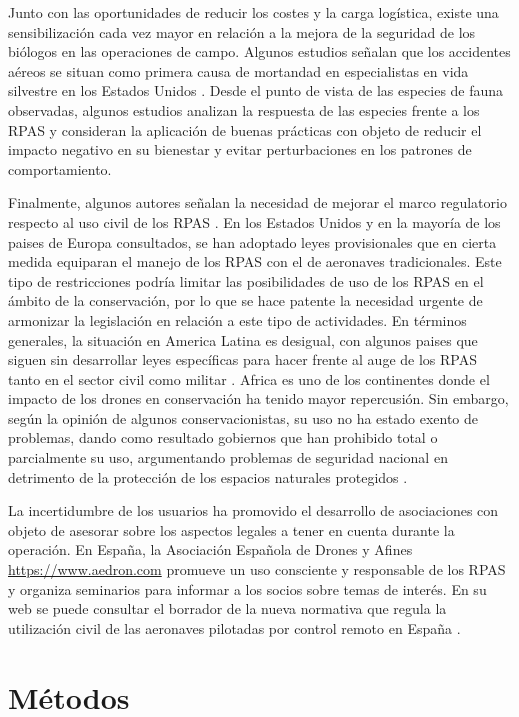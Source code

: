 \documentclass[11pt,]{article}
\begin{document}
Junto con las oportunidades de reducir los costes y la carga logística,
existe una sensibilización cada vez mayor en relación a la mejora de la
seguridad de los biólogos en las operaciones de campo. Algunos estudios
señalan que los accidentes aéreos se situan como primera causa de
mortandad en especialistas en vida silvestre en los Estados Unidos
\citep{Sasse2003}. Desde el punto de vista de las especies de fauna
observadas, algunos estudios analizan la respuesta de las especies
frente a los RPAS y consideran la aplicación de buenas prácticas con
objeto de reducir el impacto negativo en su bienestar y evitar
perturbaciones en los patrones de comportamiento.

Finalmente, algunos autores señalan la necesidad de mejorar el marco
regulatorio respecto al uso civil de los RPAS \citep{Nugraha2016}. En
los Estados Unidos y en la mayoría de los paises de Europa consultados,
se han adoptado leyes provisionales que en cierta medida equiparan el
manejo de los RPAS con el de aeronaves tradicionales. Este tipo de
restricciones podría limitar las posibilidades de uso de los RPAS en el
ámbito de la conservación, por lo que se hace patente la necesidad
urgente de armonizar la legislación en relación a este tipo de
actividades. En términos generales, la situación en America Latina es
desigual, con algunos paises que siguen sin desarrollar leyes
específicas para hacer frente al auge de los RPAS tanto en el sector
civil como militar \citep{Nacion2013}. Africa es uno de los continentes
donde el impacto de los drones en conservación ha tenido mayor
repercusión. Sin embargo, según la opinión de algunos conservacionistas,
su uso no ha estado exento de problemas, dando como resultado gobiernos
que han prohibido total o parcialmente su uso, argumentando problemas de
seguridad nacional en detrimento de la protección de los espacios
naturales protegidos \citep{Andrews2014}.

La incertidumbre de los usuarios ha promovido el desarrollo de
asociaciones con objeto de asesorar sobre los aspectos legales a tener
en cuenta durante la operación. En España, la Asociación Española de
Drones y Afines \url{https://www.aedron.com} promueve un uso consciente
y responsable de los RPAS y organiza seminarios para informar a los
socios sobre temas de interés. En su web se puede consultar el borrador
de la nueva normativa que regula la utilización civil de las aeronaves
pilotadas por control remoto en España \citep{Aedron2017}.

\section{Métodos}\label{metodos}
\end{document}
